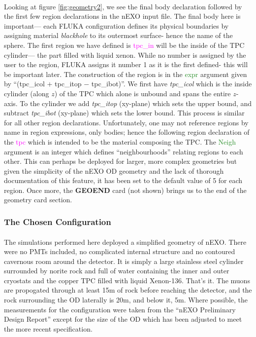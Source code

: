 \paragraph{}
Looking at figure \ref{fig:geometry2}, we see the final body declaration followed by the first few region declarations in the nEXO input file. The final body here is important— each FLUKA configuration defines its physical boundaries by assigning material \textit{blackhole} to its outermost surface- hence the name of the sphere. The first region we have defined is \textcolor{magenta}{tpc\_in} will be the inside of the TPC cylinder— the part filled with liquid xenon. While no number is assigned by the user to the region, FLUKA assigns it number 1 as it is the first defined- this will be important later. The construction of the region is in the \textcolor{ForestGreen}{expr} argument given by ``(tpc\_icol $+$ tpc\_itop $-$ tpc\_ibot)''. We first have \textit{tpc\_icol} which is the inside cylinder (along $z$) of the TPC which alone is unbound and spans the entire $z$-axis. To the cylinder we add \textit{tpc\_itop} (xy-plane) which sets the upper bound, and subtract \textit{tpc\_ibot} (xy-plane) which sets the lower bound. This process is similar for all other region declarations. Unfortunately, one may not reference regions by name in region expressions, only bodies; hence the following region declaration of the \textcolor{magenta}{tpc} which is intended to be the material composing the TPC. The \textcolor{ForestGreen}{Neigh} argument is an integer which defines ``neighbourhoods'' relating regions to each other. This can perhaps be deployed for larger, more complex geometries but given the simplicity of the nEXO OD geometry and the lack of thorough documentation of this feature, it has been set to the default value of 5 for each region. Once more, the \textbf{GEOEND} card (not shown) brings us to the end of the geometry card section.

\subsubsection{The Chosen Configuration}
\paragraph{}
The simulations performed here deployed a simplified geometry of nEXO. There were no PMTs included, no complicated internal structure and no contoured cavernous room around the detector. It is simply a large stainless steel cylinder surrounded by norite rock and full of water containing the inner and outer cryostats and the copper TPC filled with liquid Xenon-136. That's it. The muons are propogated through at least 15m of rock before reaching the detector, and the rock surrounding the OD laterally is 20m, and below it, 5m. Where possible, the measurements for the configuration were taken from the ``nEXO Preliminary Design Report'' except for the size of the OD which has been adjusted to meet the more recent specification.

